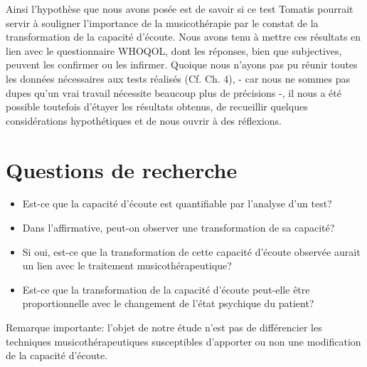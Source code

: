  Ainsi l'hypothèse que nous avons posée est de savoir si ce test Tomatis pourrait  servir à
 souligner l'importance de la musicothérapie
 par le constat de la transformation de la capacité d'écoute.
Nous avons tenu à mettre ces résultats en lien avec le questionnaire  WHOQOL, dont les réponses, bien que subjectives, peuvent les confirmer ou les infirmer. %
Quoique nous n'ayons pas pu réunir toutes les données nécessaires
aux tests réalisés (Cf. Ch. 4), - car nous ne sommes pas dupes qu'un vrai travail
nécessite beaucoup plus de précisions -, il nous a été possible toutefois d'étayer
les résultats obtenus, de recueillir quelques considérations hypothétiques et de nous ouvrir à des réflexions.







\section {Questions de recherche}




\begin{itemize}
 \item Est-ce que la capacité d'écoute est quantifiable par
          l'analyse d'un test?
        \item Dans l'affirmative,
          peut-on observer une transformation de sa capacité?
        \item Si oui, est-ce que la transformation de cette capacité d'écoute observée aurait un lien
          avec le traitement musicothérapeutique?
  \item Est-ce que la transformation de la capacité d'écoute peut-elle être proportionnelle avec le changement de l'état psychique du patient?
   \end{itemize}

Remarque importante: l'objet de notre étude n'est pas de différencier les techniques musicothérapeutiques susceptibles d'apporter ou non une modification de la capacité d'écoute.

